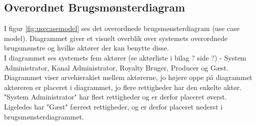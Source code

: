 \subsection{Overordnet Brugsmønsterdiagram}

\noindent 
I figur \ref{fig:usecasemodel} ses det overordnede brugsmønsterdiagram (use case model). Diagrammet giver et visuelt overblik over systemets overordnede brugsmønstre og hvilke aktører der kan benytte disse.\\

\noindent
I diagrammet ses systemets fem aktører (se aktørliste i bilag ? side ?) - System Administrator, Kanal Administrator, Royalty Bruger, Producer og Gæst. Diagrammet viser arvehierakiet mellem aktørerne, jo højere oppe på diagrammet aktøreren er placeret i diagrammet, jo flere rettigheder har den enkelte aktør. "System Administrator" har flest rettigheder og er derfor placeret øverst. Ligeledes har "Gæst" færrest rettigheder, og er derfor placeret nederst i brugsmønsterdiagrammet. 

